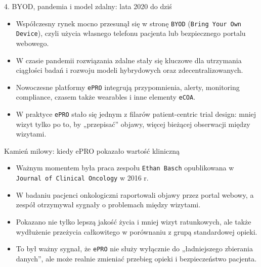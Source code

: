 \begin{frame}{4. BYOD, pandemia i model zdalny: lata 2020 do dziś}
  \begin{itemize}
    \item Współczesny rynek mocno przesunął się w stronę \texttt{BYOD} (\texttt{Bring Your Own Device}), czyli użycia własnego telefonu pacjenta lub bezpiecznego portalu webowego.
    \item W czasie pandemii rozwiązania zdalne stały się kluczowe dla utrzymania ciągłości badań i rozwoju modeli hybrydowych oraz zdecentralizowanych.
    \item Nowoczesne platformy \texttt{ePRO} integrują przypomnienia, alerty, monitoring compliance, czasem także wearables i inne elementy \texttt{eCOA}.
    \item W praktyce \texttt{ePRO} stało się jednym z filarów patient-centric trial design: mniej wizyt tylko po to, by „przepisać” objawy, więcej bieżącej obserwacji między wizytami.
  \end{itemize}
\end{frame}

\begin{frame}{Kamień milowy: kiedy ePRO pokazało wartość kliniczną}
  \begin{itemize}
    \item Ważnym momentem była praca zespołu \texttt{Ethan Basch} opublikowana w \texttt{Journal of Clinical Oncology} w 2016 r.
    \item W badaniu pacjenci onkologiczni raportowali objawy przez portal webowy, a zespół otrzymywał sygnały o problemach między wizytami.
    \item Pokazano nie tylko lepszą jakość życia i mniej wizyt ratunkowych, ale także wydłużenie przeżycia całkowitego w porównaniu z grupą standardowej opieki.
    \item To był ważny sygnał, że \texttt{ePRO} nie służy wyłącznie do „ładniejszego zbierania danych”, ale może realnie zmieniać przebieg opieki i bezpieczeństwo pacjenta.
  \end{itemize}
\end{frame}

